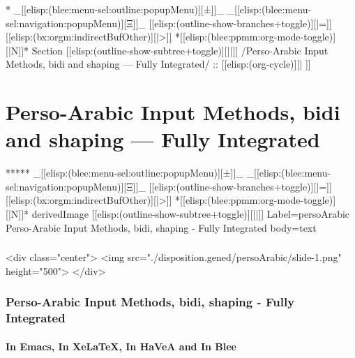 \begin{whenOrg}
\begin{whenOrg}
*  _[[elisp:(blee:menu-sel:outline:popupMenu)][±]]_ _[[elisp:(blee:menu-sel:navigation:popupMenu)][Ξ]]_ [[elisp:(outline-show-branches+toggle)][|=]] [[elisp:(bx:orgm:indirectBufOther)][|>]] *[[elisp:(blee:ppmm:org-mode-toggle)][|N]]*  Section    [[elisp:(outline-show-subtree+toggle)][||]]   /Perso-Arabic Input Methods, bidi and shaping --- Fully Integrated/ ::  [[elisp:(org-cycle)][| ]]
\end{whenOrg}

\section{Perso-Arabic Input Methods, bidi and shaping --- Fully Integrated}


\begin{whenOrg}
*****  _[[elisp:(blee:menu-sel:outline:popupMenu)][±]]_ _[[elisp:(blee:menu-sel:navigation:popupMenu)][Ξ]]_ [[elisp:(outline-show-branches+toggle)][|=]] [[elisp:(bx:orgm:indirectBufOther)][|>]] *[[elisp:(blee:ppmm:org-mode-toggle)][|N]]*  derivedImage [[elisp:(outline-show-subtree+toggle)][||]] Label=persoArabic Perso-Arabic Input Methods, bidi, shaping - Fully Integrated body=text
\end{whenOrg}

\begin{htmlonly}

\begin{frame}[fragile,plain,label=persoArabic]
    \frametitle{}
    \framesubtitle{}
    \begin{rawhtml}
<div class="center">
<img src="./disposition.gened/persoArabic/slide-1.png" height="500">
</div>
    \end{rawhtml}
\end{frame}
\end{htmlonly}

\begin{verblatex}

\begin{frame}[fragile,plain,label=persoArabic]
    \frametitle{Perso-Arabic Input Methods, bidi, shaping - Fully Integrated}
    \framesubtitle{In Emacs, In XeLaTeX, In HaVeA and In Blee}


\end{frame}
\end{verblatex}
\end{whenOrg}
